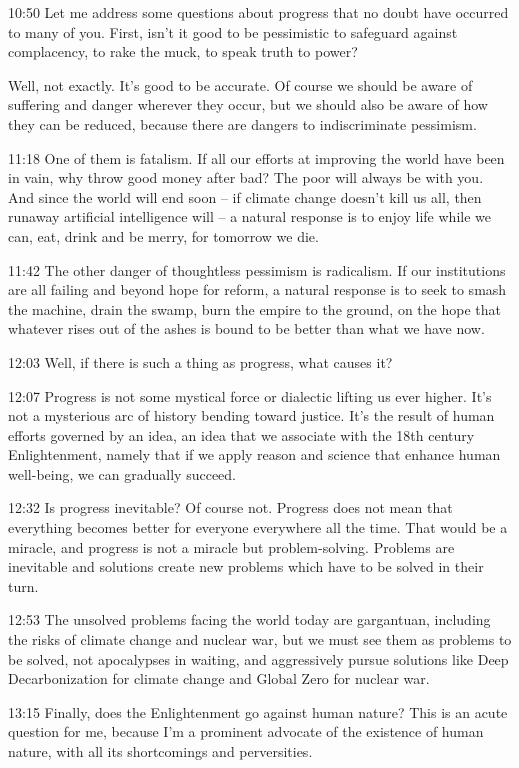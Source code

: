 \documentclass[10pt,titlepage]{book}
\begin{document}
{10:50
Let me address some questions about progress
that no doubt have occurred to many of you.
First, isn't it good to be pessimistic
to safeguard against complacency,
to rake the muck, to speak truth to power?

Well, not exactly.
It's good to be accurate.
Of course we should be aware of suffering and danger
wherever they occur,
but we should also be aware of how they can be reduced,
because there are dangers to indiscriminate pessimism.

11:18
One of them is fatalism.
If all our efforts at improving the world
have been in vain,
why throw good money after bad?
The poor will always be with you.
And since the world will end soon --
if climate change doesn't kill us all,
then runaway artificial intelligence will --
a natural response is to enjoy life while we can,
eat, drink and be merry, for tomorrow we die.

11:42
The other danger of thoughtless pessimism is radicalism.
If our institutions are all failing and beyond hope for reform,
a natural response is to seek to smash the machine,
drain the swamp,
burn the empire to the ground,
on the hope that whatever rises out of the ashes
is bound to be better than what we have now.

12:03
Well, if there is such a thing as progress,
what causes it?

12:07
Progress is not some mystical force or dialectic lifting us ever higher.
It's not a mysterious arc of history bending toward justice.
It's the result of human efforts governed by an idea,
an idea that we associate with the 18th century Enlightenment,
namely that if we apply reason and science
that enhance human well-being,
we can gradually succeed.

12:32
Is progress inevitable? Of course not.
Progress does not mean that everything becomes better
for everyone everywhere all the time.
That would be a miracle, and progress is not a miracle
but problem-solving.
Problems are inevitable
and solutions create new problems which have to be solved in their turn.

12:53
The unsolved problems facing the world today are gargantuan,
including the risks of climate change
and nuclear war,
but we must see them as problems to be solved,
not apocalypses in waiting,
and aggressively pursue solutions
like Deep Decarbonization for climate change
and Global Zero for nuclear war.

13:15
Finally, does the Enlightenment go against human nature?
This is an acute question for me,
because I'm a prominent advocate of the existence of human nature,
with all its shortcomings and perversities.

}
\end{document}

